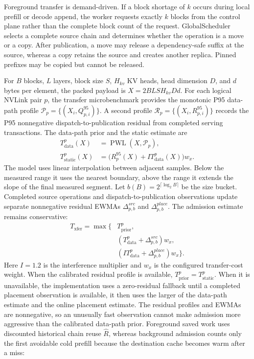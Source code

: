 \documentclass{article}
\begin{document}
Foreground transfer is demand-driven. If a block shortage of $k$ occurs during local prefill or decode append, the worker requests exactly $k$ blocks from the control plane rather than the complete block count of the request. GlobalScheduler selects a complete source chain and determines whether the operation is a move or a copy. After publication, a move may release a dependency-safe suffix at the source, whereas a copy retains the source and creates another replica. Pinned prefixes may be copied but cannot be released.

For $B$ blocks, $L$ layers, block size $S$, $H_{kv}$ KV heads, head dimension $D$, and $d$ bytes per element, the packed payload is $X=2BLSH_{kv}Dd$. For each logical NVLink pair $p$, the transfer microbenchmark provides the monotonic P95 data-path profile $\mathcal{P}_p=\{(X_i,Q^{95}_{p,i})\}$. A second profile $\mathcal{R}_p=\{(X_i,R^{95}_{p,i})\}$ records the P95 nonnegative dispatch-to-publication residual from completed serving transactions. The data-path prior and the static estimate are
\begin{align}
 T_{\mathrm{data}}^{p}(X) &= \operatorname{PWL}(X,\mathcal{P}_p), \\
 T_{\mathrm{static}}^{p}(X) &= \bigl(R^{95}_{p}(X)+I T_{\mathrm{data}}^{p}(X)\bigr)w_x.
\end{align}
The model uses linear interpolation between adjacent samples. Below the measured range it uses the nearest boundary, above the range it extends the slope of the final measured segment. Let $b(B)=2^{\lceil\log_2 B\rceil}$ be the size bucket. Completed source operations and dispatch-to-publication observations update separate nonnegative residual EWMAs $\Delta^{src}_{p,b}$ and $\Delta^{place}_{p,b}$. The admission estimate remains conservative:
\begin{equation}
\begin{aligned}
 T_{\mathrm{xfer}}=\max\bigl\{&
 T_{\mathrm{prior}}^{p},\\
 &(T_{\mathrm{data}}^{p}+\Delta^{src}_{p,b})w_x,\\
 &(I T_{\mathrm{data}}^{p}+\Delta^{place}_{p,b})w_x
 \bigr\}.
\end{aligned}
\end{equation}
Here $I=1.2$ is the interference multiplier and $w_x$ is the configured transfer-cost weight. When the calibrated residual profile is available, $T_{\mathrm{prior}}^{p}=T_{\mathrm{static}}^{p}$. When it is unavailable, the implementation uses a zero-residual fallback until a completed placement observation is available, it then uses the larger of the data-path estimate and the online placement estimate. The residual profiles and EWMAs are nonnegative, so an unusually fast observation cannot make admission more aggressive than the calibrated data-path prior. Foreground saved work uses discounted historical chain reuse $\widehat{R}$, whereas background admission counts only the first avoidable cold prefill because the destination cache becomes warm after a miss:
\end{document}
